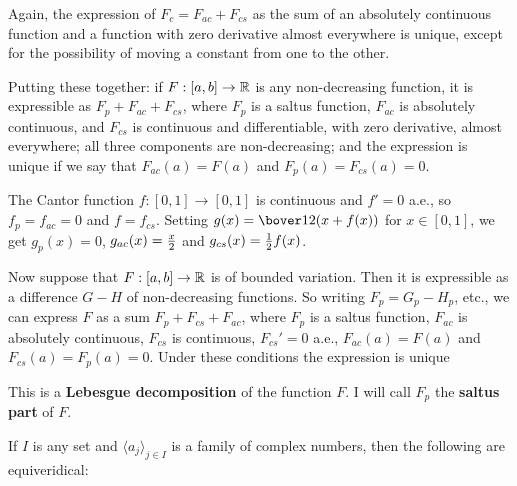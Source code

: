Again, the expression of $F_c=F_{ac}+F_{cs}$ as the sum of an absolutely
continuous function and a function with zero derivative almost
everywhere is unique, except for the possibility of moving a constant
from one to the other.

 Putting these together:  if
$F:[a,b]\to\Bbb R$ is any
non-decreasing function, it is expressible as $F_p+F_{ac}+F_{cs}$, where
$F_p$ is a saltus function, $F_{ac}$ is absolutely continuous, and
$F_{cs}$ is continuous and differentiable, with zero derivative, almost
everywhere;  all three components are non-decreasing;  and the
expression is unique if we say that $F_{ac}(a)=F(a)$ and
$F_p(a)=F_{cs}(a)=0$.

The Cantor function $f:[0,1]\to[0,1]$ is continuous and
$f'=0$ a.e., so $f_p=f_{ac}=0$ and $f=f_{cs}$.
Setting $g(x)=\bover12(x+f(x))$ for $x\in[0,1]$,
we get $g_p(x)=0$, $g_{ac}(x)={x\over 2}$ and
$g_{cs}(x)={1\over 2}f(x)$.

 Now suppose that $F:[a,b]\to\Bbb R$ is of
bounded variation.
Then it is expressible as a difference $G-H$ of
non-decreasing functions.   So writing $F_p=G_p-H_p$,
etc., we can express $F$ as a sum $F_p+F_{cs}+F_{ac}$, where $F_p$ is a
saltus function, $F_{ac}$ is absolutely continuous, $F_{cs}$ is
continuous, $F_{cs}'=0$ a.e., $F_{ac}(a)=F(a)$ and $F_{cs}(a)=F_{p}(a)=0$.
Under these conditions the expression is unique

This is a {\bf Lebesgue decomposition} of the function $F$.
   I will call $F_p$ the {\bf saltus part} of $F$.

  If $I$ is any set and
$\langle a_j\rangle_{j\in I}$ is a family of complex numbers, then the
following are equiveridical:



